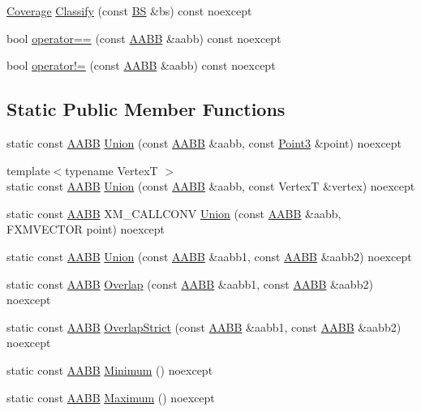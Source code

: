 \begin{DoxyCompactItemize}
\item 
\hyperlink{namespacemage_aa9fe157e5a578a103160266df8cccb0a}{Coverage} \hyperlink{classmage_1_1_a_a_b_b_a3092e0f6765695222f78bcfd78d67a6b}{Classify} (const \hyperlink{classmage_1_1_b_s}{BS} \&bs) const noexcept
\item 
bool \hyperlink{classmage_1_1_a_a_b_b_a9297ff005f7bdcd934d744a6fb7ab5c9}{operator==} (const \hyperlink{classmage_1_1_a_a_b_b}{A\+A\+BB} \&aabb) const noexcept
\item 
bool \hyperlink{classmage_1_1_a_a_b_b_a1d23b60e46979cedc037fc59b3752572}{operator!=} (const \hyperlink{classmage_1_1_a_a_b_b}{A\+A\+BB} \&aabb) const noexcept
\end{DoxyCompactItemize}
\subsection*{Static Public Member Functions}
\begin{DoxyCompactItemize}
\item 
static const \hyperlink{classmage_1_1_a_a_b_b}{A\+A\+BB} \hyperlink{classmage_1_1_a_a_b_b_a9a75cf988f07e9ae6016e28f4ff389b4}{Union} (const \hyperlink{classmage_1_1_a_a_b_b}{A\+A\+BB} \&aabb, const \hyperlink{structmage_1_1_point3}{Point3} \&point) noexcept
\item 
{\footnotesize template$<$typename VertexT $>$ }\\static const \hyperlink{classmage_1_1_a_a_b_b}{A\+A\+BB} \hyperlink{classmage_1_1_a_a_b_b_a099a933f0eb2ce9ec3c3476be44e0372}{Union} (const \hyperlink{classmage_1_1_a_a_b_b}{A\+A\+BB} \&aabb, const VertexT \&vertex) noexcept
\item 
static const \hyperlink{classmage_1_1_a_a_b_b}{A\+A\+BB} X\+M\+\_\+\+C\+A\+L\+L\+C\+O\+NV \hyperlink{classmage_1_1_a_a_b_b_ac7359d9d73a14c0c26f8caac2a315732}{Union} (const \hyperlink{classmage_1_1_a_a_b_b}{A\+A\+BB} \&aabb, F\+X\+M\+V\+E\+C\+T\+OR point) noexcept
\item 
static const \hyperlink{classmage_1_1_a_a_b_b}{A\+A\+BB} \hyperlink{classmage_1_1_a_a_b_b_ab95df16dfe5dde6b7c207ac16d89005c}{Union} (const \hyperlink{classmage_1_1_a_a_b_b}{A\+A\+BB} \&aabb1, const \hyperlink{classmage_1_1_a_a_b_b}{A\+A\+BB} \&aabb2) noexcept
\item 
static const \hyperlink{classmage_1_1_a_a_b_b}{A\+A\+BB} \hyperlink{classmage_1_1_a_a_b_b_a13ec9c0b1ae4d0bf7c53e85c18152f4e}{Overlap} (const \hyperlink{classmage_1_1_a_a_b_b}{A\+A\+BB} \&aabb1, const \hyperlink{classmage_1_1_a_a_b_b}{A\+A\+BB} \&aabb2) noexcept
\item 
static const \hyperlink{classmage_1_1_a_a_b_b}{A\+A\+BB} \hyperlink{classmage_1_1_a_a_b_b_aba50102ea44d8d86e66e69e561c2fce2}{Overlap\+Strict} (const \hyperlink{classmage_1_1_a_a_b_b}{A\+A\+BB} \&aabb1, const \hyperlink{classmage_1_1_a_a_b_b}{A\+A\+BB} \&aabb2) noexcept
\item 
static const \hyperlink{classmage_1_1_a_a_b_b}{A\+A\+BB} \hyperlink{classmage_1_1_a_a_b_b_a5c3806391e85968725ddb5164c92a99e}{Minimum} () noexcept
\item 
static const \hyperlink{classmage_1_1_a_a_b_b}{A\+A\+BB} \hyperlink{classmage_1_1_a_a_b_b_a776d14b6995233ac53fa85e83854ef78}{Maximum} () noexcept
\end{DoxyCompactItemize}

